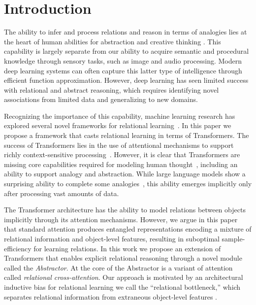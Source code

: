 \section{Introduction}

The ability to infer and process relations and reason in terms of analogies lies at the heart of human abilities for abstraction and creative thinking
\citep{snow,holyoak}. This capability is largely separate from our ability to acquire semantic and procedural knowledge through sensory tasks, such as image and audio processing. Modern deep learning systems can often capture this latter type of intelligence through efficient function approximation. However, deep learning has seen limited success with relational and abstract reasoning, which requires identifying novel associations from limited data and generalizing to new domains.

Recognizing the importance of this capability, machine learning research has explored several novel frameworks for relational learning~\citep{NTM, episodicControl, santoro1,battaglia,barrett:2018,shanahanExplicitlyRelationalNeural,TEM,esbn,mondal23learned}. In this paper we propose a framework that casts relational learning in terms of Transformers. The success of Transformers lies in the use of attentional mechanisms to support richly context-sensitive processing~\citep{vaswani2017attention,transformers,kerg2020untangling}. However, it is clear that Transformers are missing core capabilities required for modeling human thought~\citep{mahowald2023dissociating}, including an ability to support analogy and abstraction. While large language models show a surprising ability to complete some analogies~\citep{webb2023emergent}, this ability emerges implicitly only after processing vast amounts of data.

The Transformer architecture has the ability to model relations between objects implicitly through its attention mechanisms. However, we argue in this paper that standard attention produces entangled representations encoding a mixture of relational information and object-level features, resulting in suboptimal sample-efficiency for learning relations.
In this work we propose an extension of Transformers that enables explicit relational reasoning through a novel module called the \textit{Abstractor}. At the core of the Abstractor is a variant of attention called \textit{relational cross-attention}. Our approach is motivated by an architectural inductive bias for relational learning we call the ``relational bottleneck,'' which separates relational information from extraneous object-level features \citep[see][for a cognitive science perspective on this idea]{webb2024relational}.

